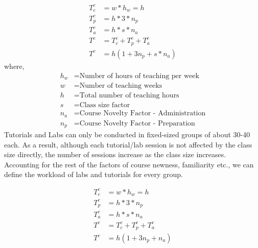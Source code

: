 \begin{equation}
    \begin{aligned}
        T^c_c & = w*h_w = h            \\
        T^c_p & = h * 3 * n_p          \\
        T^c_a & = h * s * n_a          \\
        T^c   & = T^c_c +T^c_p + T^c_a \\
        T^c   & = h(1 + 3 n_p + s*n_a)
    \end{aligned}
\end{equation}
where,
\begin{equation}
    \nonumber
    \begin{aligned}
        h_w & = \text{Number of hours of teaching per week}   \\
        w   & = \text{Number of teaching weeks}               \\
        h   & = \text{Total number of teaching hours}         \\
        s   & = \text{Class size factor}                      \\
        n_a & = \text{Course Novelty Factor - Administration} \\
        n_p & = \text{Course Novelty Factor - Preparation}
    \end{aligned}
\end{equation}
Tutorials and Labs can only be conducted in fixed-sized groups of about 30-40 each. As a result, although each tutorial/lab session is not affected by the class size directly, the number of sessions increase as the class size increases. Accounting for the rest of the factors of course newness, familiarity etc., we can define the workload of labs and tutorials for every group.

\begin{equation}
    \begin{aligned}
        T^c_c & = w*h_w = h            \\
        T^c_p & = h * 3 * n_p          \\
        T^c_a & = h * s * n_a          \\
        T^c   & = T^c_c +T^c_p + T^c_a \\
        T^c   & = h(1 + 3 n_p + n_a)
    \end{aligned}
\end{equation}

